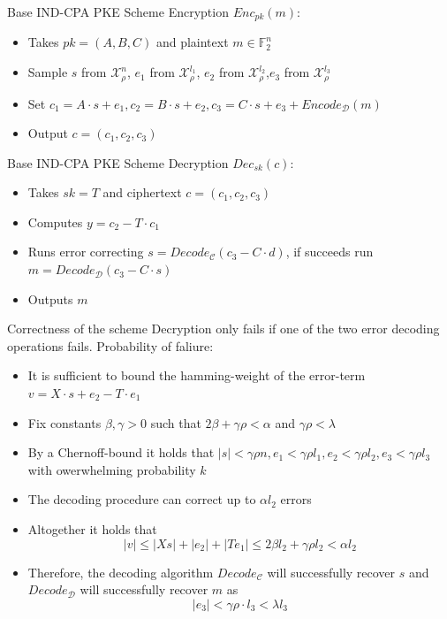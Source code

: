 \documentclass{beamer}
\begin{document}
\begin{frame}{Base IND-CPA PKE Scheme Encryption}
  $Enc_{pk}(m)$:
  \begin{itemize}
    \item Takes $pk = (A,B,C)$ and plaintext $m \in \mathbb{F}_2^n$
    \item Sample $s$ from $\mathcal{X}^n_{\rho}$, $e_1$ from $\mathcal{X}_{\rho}^{l_1}$, $e_2$ from $\mathcal{X}_{\rho}^{l_2}$,$e_3$ from $\mathcal{X}_{\rho}^{l_3}$
    \item Set $c_1  = A \cdot s + e_1, c_2 = B \cdot s + e_2, c_3 = C \cdot s + e_3 + Encode_{\mathcal{D}}(m)$
    \item Output $c = (c_1, c_2, c_3)$
  \end{itemize}
\end{frame}


\begin{frame}{Base IND-CPA PKE Scheme Decryption}
  $Dec_{sk}(c)$:
  \begin{itemize}
    \item Takes $sk = T$ and ciphertext $c = (c_1, c_2, c_3)$
    \item Computes $ y = c_2 - T \cdot c_1 $
    \item Runs error correcting $ s = Decode_{\mathcal{C}}(c_3 - C \cdot d ) $,  if succeeds run $ m = Decode_{\mathcal{D}}(c_3 - C \cdot s) $
    \item Outputs $m$
  \end{itemize}
\end{frame}

\begin{frame}{Correctness of the scheme}
  Decryption only fails if one of the two error decoding operations fails.
  Probability of faliure:
  \begin{itemize}
    \item It is sufficient to bound the hamming-weight of the error-term $ v = X \cdot s + e_2 - T \cdot e_1 $
    \item Fix constants $ \beta,\gamma > 0 $ such that $ 2\beta + \gamma \rho < \alpha $ and $ \gamma \rho < \lambda $
    \item By a Chernoff-bound it holds that $ |s| < \gamma \rho n, e_1 < \gamma \rho l_1, e_2 < \gamma \rho l_2, e_3 < \gamma \rho l_3 $ with owerwhelming probability $k$
    \item The decoding procedure can correct up to $\alpha l_2$ errors
    \item Altogether it holds that $$ |v| \leq |Xs| + |e_2| + |Te_1| \leq 2 \beta l_2 + \gamma \rho l_2 < \alpha l_2 $$
    \item Therefore, the decoding algorithm $Decode_{\mathcal{C}}$ will successfully recover $s$ and $Decode_{\mathcal{D}}$ will successfully recover $m$ as $$ |e_3| < \gamma \rho \cdot l_3 < \lambda l_3 $$
  \end{itemize}

\end{frame}
\end{document}
